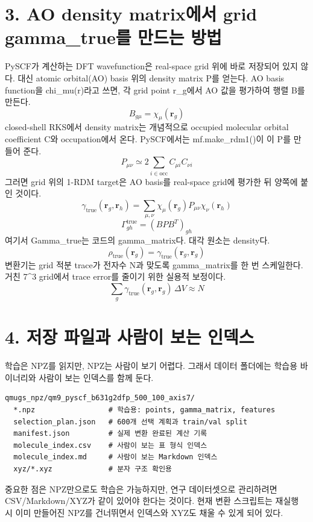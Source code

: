 \documentclass[11pt]{article}
\begin{document}
\section*{3. AO density matrix에서 grid gamma\_true를 만드는 방법}
PySCF가 계산하는 DFT wavefunction은 real-space grid 위에 바로 저장되어 있지 않다. 대신 atomic orbital(AO) basis 위의 density matrix P를 얻는다. AO basis function을 chi\_mu(r)라고 쓰면, 각 grid point r\_g에서 AO 값을 평가하여 행렬 B를 만든다.
\[
B_{g\mu} = \chi_\mu(\mathbf{r}_g)
\]
closed-shell RKS에서 density matrix는 개념적으로 occupied molecular orbital coefficient C와 occupation에서 온다. PySCF에서는 mf.make\_rdm1()이 이 P를 만들어 준다.
\[
P_{\mu\nu} \simeq 2\sum_{i\in \mathrm{occ}} C_{\mu i} C_{\nu i}
\]
그러면 grid 위의 1-RDM target은 AO basis를 real-space grid에 평가한 뒤 양쪽에 붙인 것이다.
\[
\gamma_{\mathrm{true}}(\mathbf{r}_g,\mathbf{r}_h)=\sum_{\mu,\nu}\chi_\mu(\mathbf{r}_g)P_{\mu\nu}\chi_\nu(\mathbf{r}_h)
\]
\[
\Gamma^{\mathrm{true}}_{gh}=(B P B^{T})_{gh}
\]
여기서 Gamma\_true는 코드의 gamma\_matrix다. 대각 원소는 density다.
\[
\rho_{\mathrm{true}}(\mathbf{r}_g)=\gamma_{\mathrm{true}}(\mathbf{r}_g,\mathbf{r}_g)
\]
변환기는 grid 적분 trace가 전자수 N과 맞도록 gamma\_matrix를 한 번 스케일한다. 거친 7^3 grid에서 trace error를 줄이기 위한 실용적 보정이다.
\[
\sum_g \gamma_{\mathrm{true}}(\mathbf{r}_g,\mathbf{r}_g)\,\Delta V \approx N
\]
\section*{4. 저장 파일과 사람이 보는 인덱스}
학습은 NPZ를 읽지만, NPZ는 사람이 보기 어렵다. 그래서 데이터 폴더에는 학습용 바이너리와 사람이 보는 인덱스를 함께 둔다.
\begin{lstlisting}
qmugs_npz/qm9_pyscf_b631g2dfp_500_100_axis7/
  *.npz                 # 학습용: points, gamma_matrix, features
  selection_plan.json   # 600개 선택 계획과 train/val split
  manifest.json         # 실제 변환 완료된 계산 기록
  molecule_index.csv    # 사람이 보는 표 형식 인덱스
  molecule_index.md     # 사람이 보는 Markdown 인덱스
  xyz/*.xyz             # 분자 구조 확인용
\end{lstlisting}
중요한 점은 NPZ만으로도 학습은 가능하지만, 연구 데이터셋으로 관리하려면 CSV/Markdown/XYZ가 같이 있어야 한다는 것이다. 현재 변환 스크립트는 재실행 시 이미 만들어진 NPZ를 건너뛰면서 인덱스와 XYZ도 채울 수 있게 되어 있다.
\end{document}
